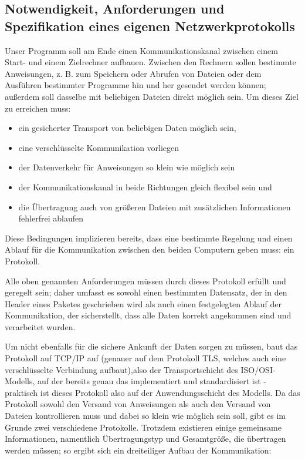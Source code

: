 \subsection{Notwendigkeit, Anforderungen und Spezifikation eines eigenen Netzwerkprotokolls}
Unser Programm soll am Ende einen Kommunikationskanal zwischen einem Start- und einem Zielrechner aufbauen. 
Zwischen den Rechnern sollen bestimmte Anweisungen, z. B. zum Speichern oder Abrufen von Dateien oder dem Ausführen bestimmter Programme hin und her gesendet werden können; außerdem soll dasselbe mit beliebigen Dateien direkt möglich sein.
Um dieses Ziel zu erreichen muss:
\begin{itemize}
\item ein gesicherter Transport von beliebigen Daten möglich sein,
\item eine verschlüsselte Kommunikation vorliegen
\item der Datenverkehr für Anweisungen so klein wie möglich sein
\item der Kommunikationskanal in beide Richtungen gleich flexibel sein und
\item die Übertragung auch von größeren Dateien mit zusätzlichen Informationen fehlerfrei ablaufen
\end{itemize}
Diese Bedingungen implizieren bereits, dass eine bestimmte Regelung und einen Ablauf für die Kommunikation zwischen den beiden Computern geben muss: ein Protokoll.\par
Alle oben genannten Anforderungen müssen durch dieses Protokoll erfüllt und geregelt sein; daher umfasst es sowohl einen bestimmten Datensatz, der in den Header eines Paketes geschrieben wird als auch einen festgelegten Ablauf der Kommunikation, der sicherstellt, dass alle Daten korrekt angekommen sind und verarbeitet wurden.\par 
Um nicht ebenfalls für die sichere Ankunft der Daten sorgen zu müssen, baut das Protokoll auf TCP/IP auf (genauer auf dem Protokoll TLS, welches auch eine verschlüsselte Verbindung aufbaut),also der Transportschicht des ISO/OSI-Modells, auf der bereits genau das implementiert und standardisiert ist - praktisch ist dieses Protokoll also auf der Anwendungsschicht des Modells.
Da das Protokoll sowohl den Versand von Anweisungen als auch den Versand von Dateien kontrollieren muss und dabei so klein wie möglich sein soll, gibt es im Grunde zwei verschiedene Protokolle.
Trotzdem existieren einige gemeinsame Informationen, namentlich Übertragungstyp und Gesamtgröße, die übertragen werden müssen; so ergibt sich ein dreiteiliger Aufbau der Kommunikation:\par
